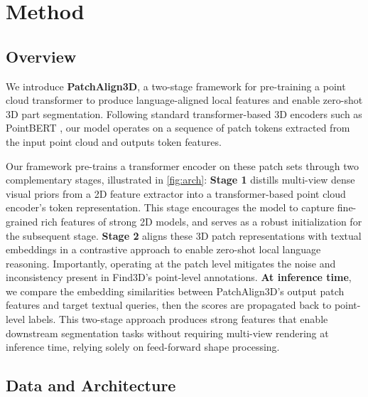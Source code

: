 \section{Method}
\label{sec:method}

\subsection{Overview}

We introduce \textbf{PatchAlign3D}, a two-stage framework for pre-training a point cloud transformer
to produce language-aligned local features and enable zero-shot 3D part segmentation.  
Following standard transformer-based 3D encoders such as PointBERT \cite{yu2022point}, our model operates on a sequence of patch tokens extracted from the input point cloud and outputs token features.

Our framework pre-trains a transformer encoder on these patch sets through two complementary stages, illustrated in \cref{fig:arch}:
\textbf{Stage 1} distills multi-view dense visual priors from a 2D feature extractor into a transformer-based point cloud encoder's token representation. This stage encourages the model to capture fine-grained rich features of strong 2D models, and serves as a robust initialization for the subsequent stage.
\textbf{Stage 2} aligns these 3D patch representations with textual embeddings in a contrastive approach to enable zero-shot local language reasoning. Importantly, operating at the patch level mitigates the noise and inconsistency present in Find3D's point-level annotations.
\textbf{At inference time}, we compare the embedding similarities between PatchAlign3D's output patch features and target textual queries, then the scores are propagated back to point-level labels.  
This two-stage approach produces strong features that enable downstream segmentation tasks without requiring multi-view rendering at inference time, relying solely on feed-forward shape processing.

\subsection{Data and Architecture}

